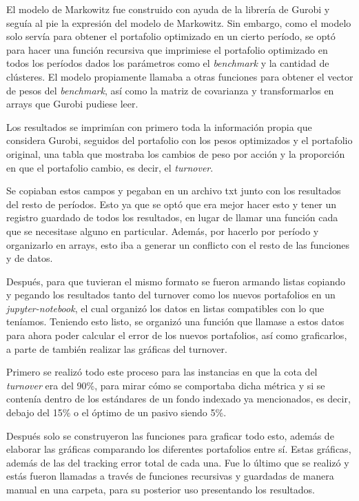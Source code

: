 \documentclass[
]{article}
\begin{document}
El modelo de Markowitz fue construido con ayuda de la librería de Gurobi y seguía
al pie la expresión del modelo de Markowitz. Sin embargo, como el modelo solo
servía para obtener el portafolio optimizado en un cierto período, se optó para hacer
una función recursiva que imprimiese el portafolio optimizado en todos los períodos
dados los parámetros como el \emph{benchmark} y la cantidad de clústeres. El modelo
propiamente llamaba a otras funciones para obtener el vector de pesos del
\emph{benchmark}, así como la matriz de covarianza y transformarlos en arrays que Gurobi
pudiese leer.

Los resultados se imprimían con primero toda la información propia que considera
Gurobi, seguidos del portafolio con los pesos optimizados y el portafolio original,
una tabla que mostraba los cambios de peso por acción y la proporción en que el
portafolio cambio, es decir, el \emph{turnover}.

Se copiaban estos campos y pegaban en un archivo txt junto con los resultados del
resto de períodos. Esto ya que se optó que era mejor hacer esto y tener un registro
guardado de todos los resultados, en lugar de llamar una función cada que se
necesitase alguno en particular. Además, por hacerlo por período y organizarlo en
arrays, esto iba a generar un conflicto con el resto de las funciones y de datos.

Después, para que tuvieran el mismo formato se fueron armando listas copiando y
pegando los resultados tanto del turnover como los nuevos portafolios en un \emph{jupyter-notebook}, 
el cual organizó los datos en listas compatibles con lo que teníamos.
Teniendo esto listo, se organizó una función que llamase a estos datos para ahora
poder calcular el error de los nuevos portafolios, así como graficarlos, a parte de
también realizar las gráficas del turnover.

Primero se realizó todo este proceso para las instancias en que la cota del \emph{turnover}
era del 90\%, para mirar cómo se comportaba dicha métrica y si se contenía dentro
de los estándares de un fondo indexado ya mencionados, es decir, debajo del 15\%
o el óptimo de un pasivo siendo 5\%.

Después solo se construyeron las funciones para graficar todo esto, además de
elaborar las gráficas comparando los diferentes portafolios entre sí. Estas gráficas,
además de las del tracking error total de cada una. Fue lo último que se realizó y
estás fueron llamadas a través de funciones recursivas y guardadas de manera
manual en una carpeta, para su posterior uso presentando los resultados.
\end{document}
